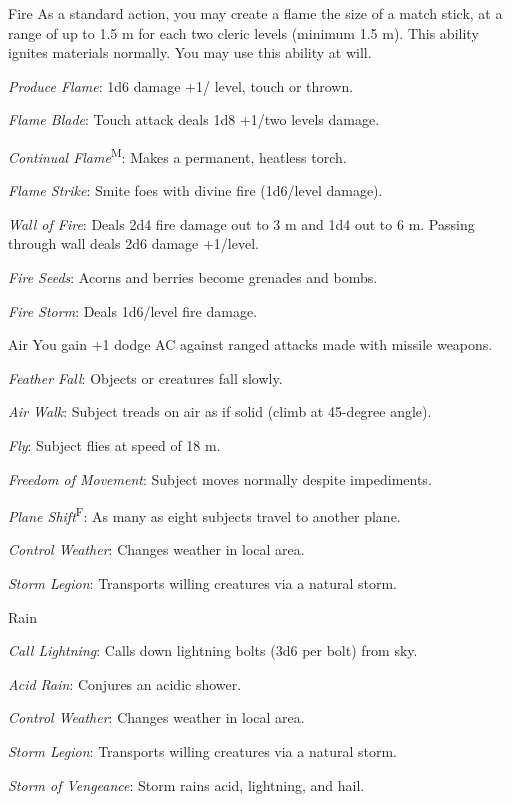 {Fire}
{As a standard action, you may create a flame the size of a match stick, at a range of up to 1.5 m for each two cleric levels (minimum 1.5 m). This ability ignites materials normally. You may use this ability at will.}
{
	\item \textit{Produce Flame}: 1d6 damage +1/ level, touch or thrown.
	\item \textit{Flame Blade}: Touch attack deals 1d8 +1/two levels damage.
	\item \textit{Continual Flame}\textsuperscript{M}: Makes a permanent, heatless torch.
	\item \textit{Flame Strike}: Smite foes with divine fire (1d6/level damage).
	\item \textit{Wall of Fire}: Deals 2d4 fire damage out to 3 m and 1d4 out to 6 m. Passing through wall deals 2d6 damage +1/level.
	\item \textit{Fire Seeds}: Acorns and berries become grenades and bombs.
	\item \textit{Fire Storm}: Deals 1d6/level fire damage.
	\item 
	\item 
}

{Air}
{You gain +1 dodge AC against ranged attacks made with missile weapons.}
{
	\item \textit{Feather Fall}: Objects or creatures fall slowly.
	\item \textit{Air Walk}: Subject treads on air as if solid (climb at 45-degree angle).
	\item \textit{Fly}: Subject flies at speed of 18 m.
	\item \textit{Freedom of Movement}: Subject moves normally despite impediments.
	\item \textit{Plane Shift}\textsuperscript{F}: As many as eight subjects travel to another plane.
	\item 
	\item \textit{Control Weather}: Changes weather in local area.
	\item \textit{Storm Legion}: Transports willing creatures via a natural storm.
	\item 
}

{Rain}
{}
{
	\item 
	\item 
	\item \textit{Call Lightning}: Calls down lightning bolts (3d6 per bolt) from sky.
	\item \textit{Acid Rain}: Conjures an acidic shower.
	\item 
	\item 
	\item \textit{Control Weather}: Changes weather in local area.
	\item \textit{Storm Legion}: Transports willing creatures via a natural storm.
	\item \textit{Storm of Vengeance}: Storm rains acid, lightning, and hail.
}

